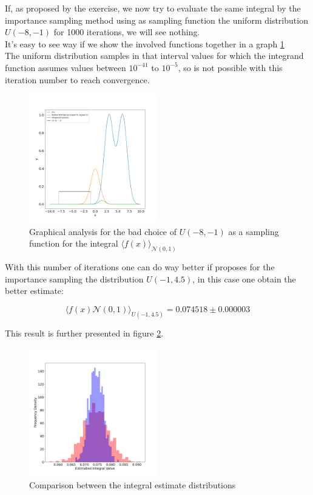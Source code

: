 If, as proposed by the exercise, we now try to evaluate the same integral by the importance sampling 
method using as sampling function the uniform distribution $U(-8, -1)$ for 1000 iterations, we will see nothing. \\
It's easy to see way if we show the involved functions together in a graph \ref{badchoice} \\
The uniform distribution samples in that interval values for which the integrand function assumes values between $10^{-41}$ to $10^{-5}$, 
so is not possible with this iteration number to reach convergence.  

\begin{figure}[H]
  \centering
  \includegraphics[width=0.5\textwidth]{FIG/exercise_3_images/distribution_consideration.png}
  \caption{Graphical analysis for the bad choice of $U(-8,-1)$ as a sampling function for the integral $\langle f(x) \rangle_{\mathcal{N}(0,1)}$}
  \label{badchoice}
  \end{figure}

With this number of iterations one can do way better if proposes for the importance sampling the distribution $U(-1, 4.5)$, in this case one obtain the better estimate:

$$ \langle f(x)\mathcal{N}(0,1) \rangle_{U(-1,4.5)} =  0.074518 \pm 0.000003  $$

This result is further presented in figure \ref{lec3:comparison_part2}.

\begin{figure}[H]
  \centering
  \includegraphics[width=0.5\textwidth]{FIG/exercise_3_images/distribution_comparison_part2.png}
  \caption{Comparison between the integral estimate distributions}
  \label{lec3:comparison_part2}
  \end{figure}

